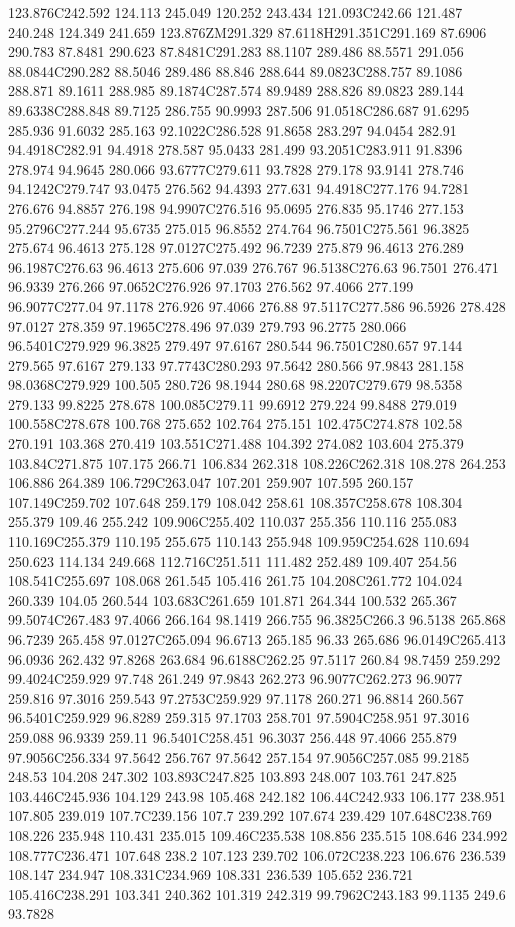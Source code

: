123.876C242.592 124.113 245.049 120.252 243.434 121.093C242.66 121.487 240.248 124.349 241.659 123.876ZM291.329 87.6118H291.351C291.169 87.6906 290.783 87.8481 290.623 87.8481C291.283 88.1107 289.486 88.5571 291.056 88.0844C290.282 88.5046 289.486 88.846 288.644 89.0823C288.757 89.1086 288.871 89.1611 288.985 89.1874C287.574 89.9489 288.826 89.0823 289.144 89.6338C288.848 89.7125 286.755 90.9993 287.506 91.0518C286.687 91.6295 285.936 91.6032 285.163 92.1022C286.528 91.8658 283.297 94.0454 282.91 94.4918C282.91 94.4918 278.587 95.0433 281.499 93.2051C283.911 91.8396 278.974 94.9645 280.066 93.6777C279.611 93.7828 279.178 93.9141 278.746 94.1242C279.747 93.0475 276.562 94.4393 277.631 94.4918C277.176 94.7281 276.676 94.8857 276.198 94.9907C276.516 95.0695 276.835 95.1746 277.153 95.2796C277.244 95.6735 275.015 96.8552 274.764 96.7501C275.561 96.3825 275.674 96.4613 275.128 97.0127C275.492 96.7239 275.879 96.4613 276.289 96.1987C276.63 96.4613 275.606 97.039 276.767 96.5138C276.63 96.7501 276.471 96.9339 276.266 97.0652C276.926 97.1703 276.562 97.4066 277.199 96.9077C277.04 97.1178 276.926 97.4066 276.88 97.5117C277.586 96.5926 278.428 97.0127 278.359 97.1965C278.496 97.039 279.793 96.2775 280.066 96.5401C279.929 96.3825 279.497 97.6167 280.544 96.7501C280.657 97.144 279.565 97.6167 279.133 97.7743C280.293 97.5642 280.566 97.9843 281.158 98.0368C279.929 100.505 280.726 98.1944 280.68 98.2207C279.679 98.5358 279.133 99.8225 278.678 100.085C279.11 99.6912 279.224 99.8488 279.019 100.558C278.678 100.768 275.652 102.764 275.151 102.475C274.878 102.58 270.191 103.368 270.419 103.551C271.488 104.392 274.082 103.604 275.379 103.84C271.875 107.175 266.71 106.834 262.318 108.226C262.318 108.278 264.253 106.886 264.389 106.729C263.047 107.201 259.907 107.595 260.157 107.149C259.702 107.648 259.179 108.042 258.61 108.357C258.678 108.304 255.379 109.46 255.242 109.906C255.402 110.037 255.356 110.116 255.083 110.169C255.379 110.195 255.675 110.143 255.948 109.959C254.628 110.694 250.623 114.134 249.668 112.716C251.511 111.482 252.489 109.407 254.56 108.541C255.697 108.068 261.545 105.416 261.75 104.208C261.772 104.024 260.339 104.05 260.544 103.683C261.659 101.871 264.344 100.532 265.367 99.5074C267.483 97.4066 266.164 98.1419 266.755 96.3825C266.3 96.5138 265.868 96.7239 265.458 97.0127C265.094 96.6713 265.185 96.33 265.686 96.0149C265.413 96.0936 262.432 97.8268 263.684 96.6188C262.25 97.5117 260.84 98.7459 259.292 99.4024C259.929 97.748 261.249 97.9843 262.273 96.9077C262.273 96.9077 259.816 97.3016 259.543 97.2753C259.929 97.1178 260.271 96.8814 260.567 96.5401C259.929 96.8289 259.315 97.1703 258.701 97.5904C258.951 97.3016 259.088 96.9339 259.11 96.5401C258.451 96.3037 256.448 97.4066 255.879 97.9056C256.334 97.5642 256.767 97.5642 257.154 97.9056C257.085 99.2185 248.53 104.208 247.302 103.893C247.825 103.893 248.007 103.761 247.825 103.446C245.936 104.129 243.98 105.468 242.182 106.44C242.933 106.177 238.951 107.805 239.019 107.7C239.156 107.7 239.292 107.674 239.429 107.648C238.769 108.226 235.948 110.431 235.015 109.46C235.538 108.856 235.515 108.646 234.992 108.777C236.471 107.648 238.2 107.123 239.702 106.072C238.223 106.676 236.539 108.147 234.947 108.331C234.969 108.331 236.539 105.652 236.721 105.416C238.291 103.341 240.362 101.319 242.319 99.7962C243.183 99.1135 249.6 93.7828 